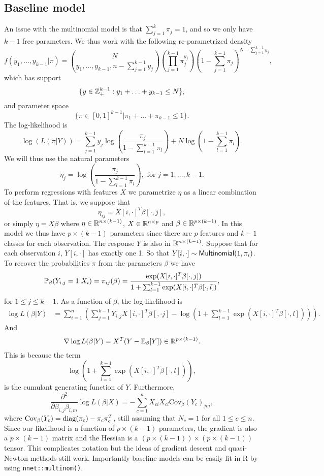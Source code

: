 \subsection{Baseline model}
An issue with the multinomial model is that $\sum_{j=1}^k \pi_j = 1$, and so we only have $k-1$ free parameters. We thus work with the following re-parametrized density
\[f(y_1,\ldots,y_{k-1}|\pi) = \binom{N}{y_1,\ldots,y_{k-1},n-\sum_{j=1}^{k-1}y_j} \left(\prod_{j=1}^{k-1}\pi_j^{y_j}\right)\left(1-\sum_{j=1}^{k-1}\pi_j\right)^{N-\sum_{j=1}^{k-1}y_{j}},\]
which has support $$\{y \in {{\mathbb Z}}_+^{k-1}:y_1+\ldots +y_{k-1} \le N\},$$ and parameter space $$\{ \pi \in [0,1]^{k-1}|\pi_1+\ldots+\pi_{k-1}\le 1\}.$$
The log-likelihood is
\[\log(L(\pi|Y)) = \sum_{j=1}^{k-1}y_j \log\left(\frac{\pi_j}{1-\sum_{l=1}^{k-1}\pi_l}\right)+N\log\left(1-\sum_{l=1}^{k-1}\pi_l\right). \]
We will thus use the natural parameters
\[\eta_j = \log\left(\frac{\pi_j}{1-\sum_{l=1}^{k-1}\pi_l}\right), \text{ for } j =1,\ldots,k-1.\]
To perform regressions with features $X$ we parametrize $\eta$ as a linear combination of the features. That is, we suppose that 
\[\eta_{ij} = X[i,\cdot]^T \beta[\cdot,j], \]
or simply $\eta = X\beta$ where $\eta \in {\mathbb R}^{n \times (k-1)}$, $X \in {\mathbb R}^{n \times p}$ and $\beta \in {\mathbb R}^{p \times (k-1)}$. In this model we thus have $p\times(k-1)$ parameters since there are $p$ features and $k-1$ classes for each observation. The response $Y$ is also in ${\mathbb R}^{n \times (k-1)}$. Suppose that for each observation $i$, $Y[i,\cdot]$ has exactly one 1. So that $Y[i,\cdot] \sim \mathsf{Multinomial}(1,\pi_i)$.  To recover the probabilities $\pi$ from the parameters $\beta$ we have
\[{\mathbb{P}}_\beta(Y_{i,j} = 1|X_i) = \pi_{ij}(\beta) = \frac{\exp(X[i,\cdot]^T\beta[\cdot,j])}{1+\sum_{l=1}^{k-1}\exp(X[i,\cdot]^T\beta[\cdot,l])}, \]
for $1 \le j \le k-1$. As a function of $\beta$, the log-likelihood is
\begin{align*}
    \log L(\beta|Y) &= \sum_{i=1}^n \left(\sum_{j=1}^{k-1}Y_{i,j}X[i,\cdot]^T\beta[,\cdot j] - \log\left(1+\sum_{l=1}^{k-1}\exp(X[i,\cdot]^T\beta[\cdot,l])\right)\right).\end{align*}
    And
    \[\nabla \log L(\beta|Y) = X^T(Y - {\mathbb{E}}_\beta[Y]) \in {\mathbb R}^{p\times (k-1)}.\]
    This is because the term 
    \[\log\left(1+\sum_{l=1}^{k-1}\exp(X[i,\cdot]^T\beta[\cdot,l])\right),\]
    is the cumulant generating function of $Y$. Furthermore,
    \[\frac{\partial^2}{\partial \beta_{i,j}\beta_{l,m}} \log L(\beta|X) =-\sum_{c=1}^n X_{ci}X_{cl} \text{Cov}_\beta(Y_c)_{jm}, \]
where $\text{Cov}_\beta(Y_c) = \operatorname{diag}(\pi_c)-\pi_c\pi_c^T$, still assuming that $N_c=1$ for all $1\le c\le n$. Since our likelihood is a function of $p \times (k-1)$ parameters, the gradient is also a $p \times (k-1)$ matrix and the Hessian is a $(p \times (k-1)) \times (p \times (k-1))$ tensor. This complicates notation but the ideas of gradient descent and quasi-Newton methods still work. Importantly baseline models can be easily fit in R by using \texttt{nnet::multinom()}. 
